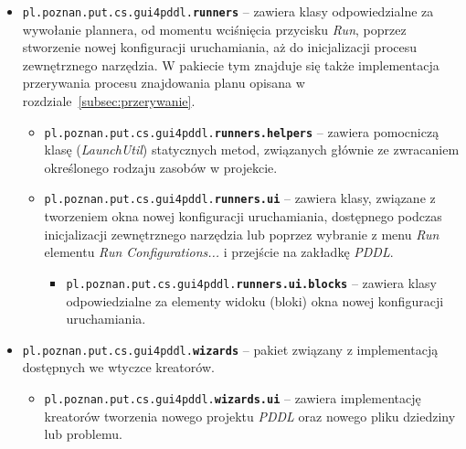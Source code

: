 \begin{itemize}
\begin{itemize}
\end{itemize}
\item \texttt{pl.poznan.put.cs.gui4pddl.\textbf{runners}} -- zawiera klasy odpowiedzialne za wywołanie plannera, od momentu wciśnięcia przycisku \textit{Run}, poprzez stworzenie nowej konfiguracji uruchamiania, aż do inicjalizacji procesu zewnętrznego narzędzia. W pakiecie tym znajduje się także implementacja przerywania procesu znajdowania planu opisana w rozdziale~\ref{subsec:przerywanie}.
\begin{itemize}
\item \texttt{pl.poznan.put.cs.gui4pddl.\textbf{runners.helpers}} -- zawiera pomocniczą klasę (\textit{LaunchUtil}) statycznych metod, związanych głównie ze zwracaniem określonego rodzaju zasobów w projekcie.
\item \texttt{pl.poznan.put.cs.gui4pddl.\textbf{runners.ui}} -- zawiera klasy, związane z tworzeniem okna nowej konfiguracji uruchamiania, dostępnego podczas inicjalizacji zewnętrznego narzędzia lub poprzez wybranie z menu \textit{Run} elementu \textit{Run Configurations...} i przejście na zakładkę \textit{PDDL}.
\begin{itemize}
\item \texttt{pl.poznan.put.cs.gui4pddl.\textbf{runners.ui.blocks}} -- zawiera klasy odpowiedzialne za elementy widoku (bloki) okna nowej konfiguracji uruchamiania.
\end{itemize}
\end{itemize}
\item \texttt{pl.poznan.put.cs.gui4pddl.\textbf{wizards}} -- pakiet związany z implementacją dostępnych we wtyczce kreatorów.
\begin{itemize}
\item \texttt{pl.poznan.put.cs.gui4pddl.\textbf{wizards.ui}} -- zawiera implementację kreatorów tworzenia nowego projektu \textit{PDDL} oraz nowego pliku dziedziny lub problemu.
\end{itemize}
\end{itemize}